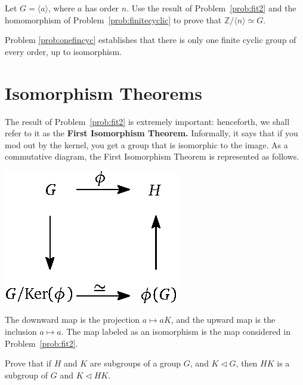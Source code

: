 \begin{problem}\label{prob:onefincyc}
Let $G = \langle a \rangle$, where $a$ has order $n$. Use the result of Problem~\ref{prob:fit2} and the homomorphism of Problem~\ref{prob:finitecyclic}
to prove that \(\mathbb{Z}/\langle n \rangle \simeq G\).
\end{problem}

Problem \ref{prob:onefincyc} establishes that there is only one finite cyclic group of every order, up to isomorphism.

\section{Isomorphism Theorems}\label{sec:isothms}

The result of Problem~\ref{prob:fit2} is extremely important: henceforth, we shall refer to it as the \textbf{First Isomorphism Theorem.}
Informally, it says that if you mod out by the kernel, you get a group that is isomorphic to the image. As a commutative diagram, the First Isomorphism Theorem is represented as follows.
\begin{center}
\includegraphics{fit.eps}
\end{center}

The downward map is the projection \(a \mapsto aK\), and the upward map is the inclusion \(a \mapsto a\). The map labeled as an isomorphism is the map considered in Problem~\ref{prob:fit2}.
\begin{annotation}
\end{annotation}

\begin{problem}\label{prob:hksubgroup}
Prove that if \(H\) and \(K\) are subgroups of a group \(G\), and \(K \lhd G\), then \(HK\)  is a subgroup of \(G\) and \(K \lhd HK\).
\end{problem}

